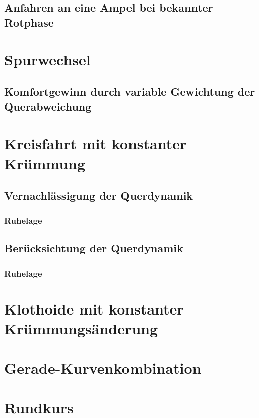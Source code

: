 \subsection{Anfahren an eine Ampel bei bekannter Rotphase}
\section{Spurwechsel}
\subsection{Komfortgewinn durch variable Gewichtung der Querabweichung}
\section{Kreisfahrt mit konstanter Krümmung}
\subsection{Vernachlässigung der Querdynamik}
\subsubsection{Ruhelage}
\subsection{Berücksichtung der Querdynamik}
\subsubsection{Ruhelage}
\section{Klothoide mit konstanter Krümmungsänderung}
\section{Gerade-Kurvenkombination}
\section{Rundkurs}